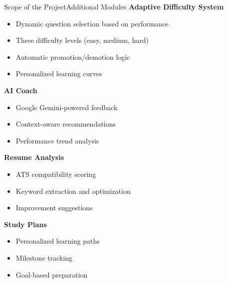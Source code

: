 \documentclass{beamer}
\begin{document}
\begin{frame}{Scope of the Project}{Additional Modules}
\textbf{Adaptive Difficulty System}
\begin{itemize}
    \item Dynamic question selection based on performance
    \item Three difficulty levels (easy, medium, hard)
    \item Automatic promotion/demotion logic
    \item Personalized learning curves
\end{itemize}

\textbf{AI Coach}
\begin{itemize}
    \item Google Gemini-powered feedback
    \item Context-aware recommendations
    \item Performance trend analysis
\end{itemize}

\textbf{Resume Analysis}
\begin{itemize}
    \item ATS compatibility scoring
    \item Keyword extraction and optimization
    \item Improvement suggestions
\end{itemize}

\textbf{Study Plans}
\begin{itemize}
    \item Personalized learning paths
    \item Milestone tracking
    \item Goal-based preparation
\end{itemize}
\end{frame}

\end{document}
